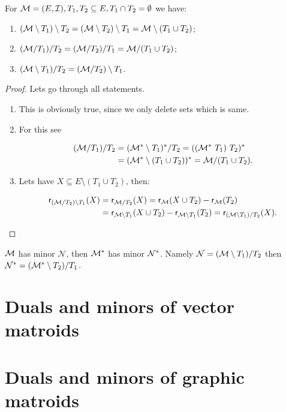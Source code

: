 \begin{claim}
	For $\mathcal{M} = (E, \mathcal{I}), T_1, T_2 \subseteq E, T_1 \cap T_2 = \emptyset$ we have:
	
	\begin{enumerate}
		\item $(\mathcal{M} \setminus T_1) \setminus T_2 = (\mathcal{M} \setminus T_2) \setminus T_1 = \mathcal{M} \setminus (T_1 \cup T_2)$;
		\item $(\mathcal{M} / T_1) / T_2 = (\mathcal{M} / T_2) / T_1 = \mathcal{M} / (T_1 \cup T_2)$;
		\item $(\mathcal{M} \setminus T_1) / T_2 = (\mathcal{M} / T_2) \setminus T_1$.
	\end{enumerate}
\end{claim}

\begin{proof}
	Lets go through all statements.
	
	\begin{enumerate}
		\item This is obviously true, since we only delete sets which is same.
		\item For this see
		
		$$
		\begin{aligned}
			(\mathcal{M} / T_1) / T_2 &= (\mathcal{M}^{\ast} \setminus T_1)^{\ast} / T_2 = ((\mathcal{M}^{\ast} \ T_1) \ T_2)^{\ast}\\
			&= (\mathcal{M}^{\ast} \setminus (T_1 \cup T_2))^{\ast} = \mathcal{M} / (T_1 \cup T_2).
		\end{aligned}
		$$
		
		\item Lets have $X \subseteq E \setminus (T_1 \cup T_2)$, then:
		
		$$
		\begin{aligned}
			\operatorname{\textsf{r}}_{(\mathcal{M} / T_2) \setminus T_1} (X) &= \operatorname{\textsf{r}}_{\mathcal{M} / T_2}(X) = \operatorname{\textsf{r}}_{\mathcal{M}} (X \cup T_2) - \operatorname{\textsf{r}}_{\mathcal{M}}(T_2)\\
			&= \operatorname{\textsf{r}}_{\mathcal{M} \setminus T_1} (X \cup T_2) - \operatorname{\textsf{r}}_{\mathcal{M} \setminus T_1} (T_2) = \operatorname{\textsf{r}}_{(\mathcal{M} \setminus T_1) / T_2} (X).
		\end{aligned}
		$$
	\end{enumerate}
\end{proof}

\begin{cor}
	$\mathcal{M}$ has minor $\mathcal{N}$, then $\mathcal{M}^{\ast}$ has minor $\mathcal{N}^{\ast}$. Namely $\mathcal{N} = (\mathcal{M} \setminus T_1) / T_2$ then $\mathcal{N}^{\ast} = (\mathcal{M}^{\ast} \setminus T_2) / T_1$.
\end{cor}

\section{Duals and minors of vector matroids}

\section{Duals and minors of graphic matroids}
